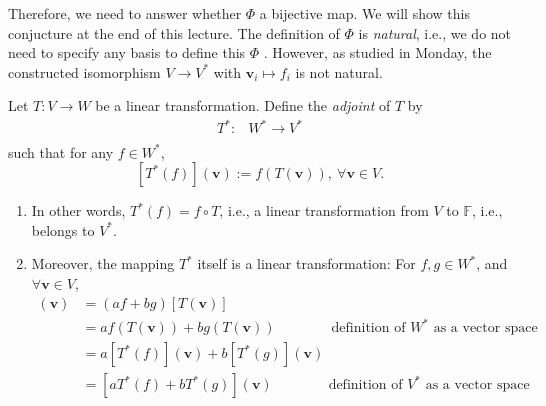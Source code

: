 Therefore, we need to answer whether $\Phi$ a bijective map. We will show this conjucture at the end of this lecture.  
The definition of $\Phi$ is \emph{natural}, i.e., we do not need to specify any basis to define this $\Phi$ . However, as studied in Monday, the constructed isomorphism $V\to V^*$ with $\bm v_i\mapsto f_i$ is not natural.


\begin{definition}
Let $T:V\to W$ be a linear transformation. 
Define the \emph{adjoint} of $T$ by
\[
\begin{array}{ll}
T^*:&W^*\to V^*\\
\end{array}
\]
such that for any $f\in W^*$, 
\[
[T^*(f)](\bm v) :=f(T(\bm v)), \ \forall \bm v\in V.
\]
\end{definition}



\begin{remark}
\begin{enumerate}
\item
In other words, $T^*(f) = f\circ T$, i.e., a linear transformation from $V$ to $\mathbb{F}$, i.e., belongs to $V^*$.
\item
Moreover, the mapping $T^*$ itself is a linear transformation:
For $f,g\in W^*$, and $\forall \bm v\in V$,
\begin{align*}
[T^*(af+bg)](\bm v) &= (af+bg)[T(\bm v)]\\
&=af(T(\bm v))+bg(T(\bm v))\qquad\qquad\text{definition of $W^*$ as a vector space}\\
&=a[T^*(f)](\bm v)+b[T^*(g)](\bm v)\\
&=[aT^*(f)+bT^*(g)](\bm v)\qquad\qquad\text{definition of $V^*$ as a vector space}
\end{align*}
\end{enumerate}
\end{remark}

